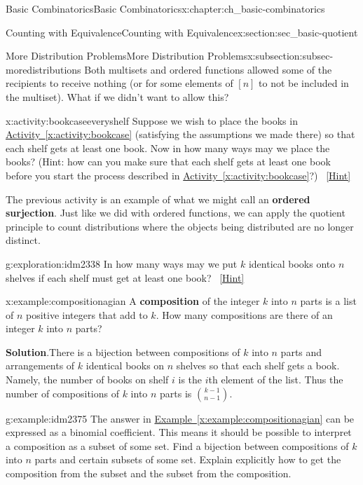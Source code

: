 \documentclass[oneside,10pt,]{book}
\newcommand{\terminology}[1]{\textbf{#1}}
\numberwithin{equation}{chapter}
\begin{document}
\begin{chapterptx}{Basic Combinatorics}{}{Basic Combinatorics}{}{}{x:chapter:ch_basic-combinatorics}
\begin{sectionptx}{Counting with Equivalence}{}{Counting with Equivalence}{}{}{x:section:sec_basic-quotient}
\begin{subsectionptx}{More Distribution Problems}{}{More Distribution Problems}{}{}{x:subsection:subsec-moredistributions}
Both multisets and ordered functions allowed some of the recipients to receive nothing (or for some elements of \([n]\) to not be included in the multiset).  What if we didn't want to allow this?%
\begin{activity}{}{x:activity:bookcaseeveryshelf}%
Suppose we wish to place the books in \hyperref[x:activity:bookcase]{Activity~\ref{x:activity:bookcase}} (satisfying the assumptions we made there) so that each shelf gets at least one book. Now in how many ways may we place the books? (Hint: how can you make sure that each shelf gets at least one book before you start the process described in \hyperref[x:activity:bookcase]{Activity~\ref{x:activity:bookcase}}?)%
\qquad~\hfill{\tiny\hyperlink{g:hint:idm2318-back}{[Hint]}}\end{activity}
The previous activity is an example of what we might call an \terminology{ordered surjection}.  Just like we did with ordered functions, we can apply the quotient principle to count distributions where the objects being distributed are no longer distinct.%
\begin{exploration}{}{g:exploration:idm2338}%
In how many ways may we put \(k\) identical books onto \(n\) shelves if each shelf must get at least one book?%
\qquad~\hfill{\tiny\hyperlink{g:hint:idm2343-back}{[Hint]}}\end{exploration}
\begin{example}{}{x:example:compositionagian}%
A \terminology{composition} of the integer \(k\) into \(n\) parts is a list of \(n\) positive integers that add to \(k\).  How many compositions are there of an integer \(k\) into \(n\) parts?%
\par\smallskip%
\noindent\textbf{Solution}.\hypertarget{g:solution:idm2364}{}\quad{}There is a bijection between compositions of \(k\) into \(n\) parts and arrangements of \(k\) identical books on \(n\) shelves so that each shelf gets a book. Namely, the number of books on shelf \(i\) is the \(i\)th element of the list. Thus the number of compositions of \(k\) into \(n\) parts is \(\binom{k-1}{n-1}\).%
\end{example}
\begin{example}{}{g:example:idm2375}%
The answer in \hyperref[x:example:compositionagian]{Example~\ref{x:example:compositionagian}} can be expressed as a binomial coefficient. This means it should be possible to interpret a composition as a subset of some set. Find a bijection between compositions of \(k\) into \(n\) parts and certain subsets of some set.  Explain explicitly how to get the composition from the subset and the subset from the composition.%

\end{example}
\end{subsectionptx}
\end{sectionptx}
\end{chapterptx}
\end{document}

